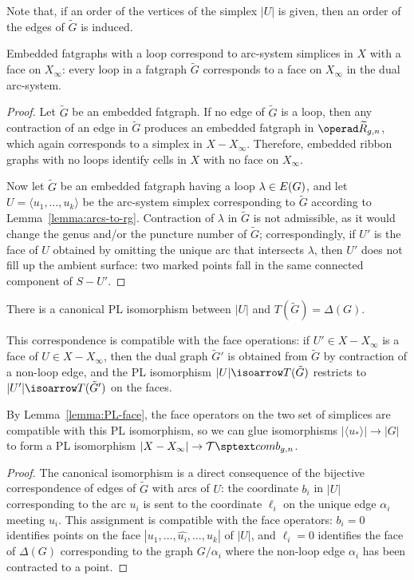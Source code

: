 Note that, if an order of the vertices of the simplex $|U|$ is given,
then an order of the edges of ${\tilde G}$ is induced.

\begin{lemma}
  \label{lemma:erg-loop}
  Embedded fatgraphs with a loop correspond to arc-system simplices
  in $X$ with a face on $X_\infty$: every loop in a fatgraph ${\tilde G}$
  corresponds to a face on $X_\infty$ in the dual arc-system.
\end{lemma}
\begin{proof}
  Let ${\tilde G}$ be an embedded fatgraph.  If no edge of
  ${\tilde G}$ is a loop, then any contraction of an edge in ${\tilde
    G}$ produces an embedded fatgraph in $\ERG_{g,n}$, which again
  corresponds to a simplex in $X - X_\infty$.  Therefore, embedded ribbon
  graphs with no loops identify cells in $X$ with no face on $X_\infty$.

  Now let ${\tilde G}$ be an embedded fatgraph having a loop $\lambda \in
  E(G)$, and let $U = \langle u_1, \ldots, u_k\rangle$ be the arc-system simplex
  corresponding to ${\tilde G}$ according to Lemma~\ref{lemma:arcs-to-rg}.
  Contraction of $\lambda$ in ${\tilde G}$ is not admissible, as it would
  change the genus and/or the puncture number of ${\tilde G}$;
  correspondingly, if $U'$ is the face of $U$ obtained by omitting the
  unique arc that intersects $\lambda$, then $U'$ does not fill up the
  ambient surface: two marked points fall in the same connected
  component of $S - U'$.
\end{proof}

\begin{lemma}
  \label{lemma:PL-face}
  There is a canonical PL isomorphism between $|U|$ and
  $T({\tilde G}) = \Delta(G)$.

  This correspondence is compatible with the face operations: if $U' \in
  X - X_\infty$ is a face of $U \in X - X_\infty$, then the dual graph ${\tilde
    G}'$ is obtained from ${\tilde G}$ by contraction of a non-loop
  edge, and the PL isomorphism $|U| \isoarrow T({\tilde G})$ restricts
  to $|U'| \isoarrow T({\tilde G}')$ on the faces.
\end{lemma}
By Lemma~\ref{lemma:PL-face}, the face operators on the two set of
simplices are compatible with this PL isomorphism, so we can glue
isomorphisms $|\langle u_*\rangle| \to |G|$ to form a PL isomorphism $|X - X_\infty| \to
\Tcomb_{g,n}$.
\begin{proof}
  The canonical isomorphism is a direct consequence of the bijective
  correspondence of edges of ${\tilde G}$ with arcs of $U$: the
  coordinate $b_i$ in $|U|$ corresponding to the arc $u_i$ is sent to
  the coordinate $\ell_i$ on the unique edge $\alpha_i$ meeting $u_i$.  This
  assignment is compatible with the face operators: $b_i=0$ identifies
  points on the face $|u_1, \ldots, \widehat{u_i}, \ldots, u_k|$ of $|U|$, and
  $\ell_i = 0$ identifies the face of $\Delta(G)$ corresponding to the graph
  $G/\alpha_i$ where the non-loop edge $\alpha_i$ has been contracted to a point.
\end{proof}


